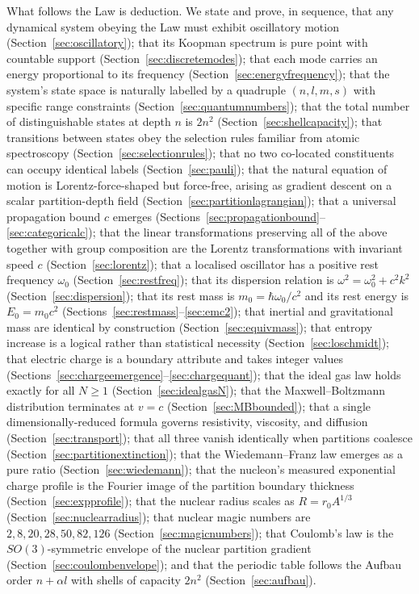 What follows the Law is deduction. We state and prove, in sequence, that any dynamical system obeying the Law must exhibit oscillatory motion (Section~\ref{sec:oscillatory}); that its Koopman spectrum is pure point with countable support (Section~\ref{sec:discretemodes}); that each mode carries an energy proportional to its frequency (Section~\ref{sec:energyfrequency}); that the system's state space is naturally labelled by a quadruple $(n,l,m,s)$ with specific range constraints (Section~\ref{sec:quantumnumbers}); that the total number of distinguishable states at depth $n$ is $2n^{2}$ (Section~\ref{sec:shellcapacity}); that transitions between states obey the selection rules familiar from atomic spectroscopy (Section~\ref{sec:selectionrules}); that no two co-located constituents can occupy identical labels (Section~\ref{sec:pauli}); that the natural equation of motion is Lorentz-force-shaped but force-free, arising as gradient descent on a scalar partition-depth field (Section~\ref{sec:partitionlagrangian}); that a universal propagation bound $c$ emerges (Sections~\ref{sec:propagationbound}--\ref{sec:categoricalc}); that the linear transformations preserving all of the above together with group composition are the Lorentz transformations with invariant speed $c$ (Section~\ref{sec:lorentz}); that a localised oscillator has a positive rest frequency $\omega_{0}$ (Section~\ref{sec:restfreq}); that its dispersion relation is $\omega^{2}=\omega_{0}^{2}+c^{2}k^{2}$ (Section~\ref{sec:dispersion}); that its rest mass is $m_{0}=\hbar\omega_{0}/c^{2}$ and its rest energy is $E_{0}=m_{0}c^{2}$ (Sections~\ref{sec:restmass}--\ref{sec:emc2}); that inertial and gravitational mass are identical by construction (Section~\ref{sec:equivmass}); that entropy increase is a logical rather than statistical necessity (Section~\ref{sec:loschmidt}); that electric charge is a boundary attribute and takes integer values (Sections~\ref{sec:chargeemergence}--\ref{sec:chargequant}); that the ideal gas law holds exactly for all $N\ge 1$ (Section~\ref{sec:idealgasN}); that the Maxwell--Boltzmann distribution terminates at $v=c$ (Section~\ref{sec:MBbounded}); that a single dimensionally-reduced formula governs resistivity, viscosity, and diffusion (Section~\ref{sec:transport}); that all three vanish identically when partitions coalesce (Section~\ref{sec:partitionextinction}); that the Wiedemann--Franz law emerges as a pure ratio (Section~\ref{sec:wiedemann}); that the nucleon's measured exponential charge profile is the Fourier image of the partition boundary thickness (Section~\ref{sec:expprofile}); that the nuclear radius scales as $R=r_{0}A^{1/3}$ (Section~\ref{sec:nuclearradius}); that nuclear magic numbers are $2,8,20,28,50,82,126$ (Section~\ref{sec:magicnumbers}); that Coulomb's law is the $SO(3)$-symmetric envelope of the nuclear partition gradient (Section~\ref{sec:coulombenvelope}); and that the periodic table follows the Aufbau order $n+\alpha l$ with shells of capacity $2n^{2}$ (Section~\ref{sec:aufbau}).

